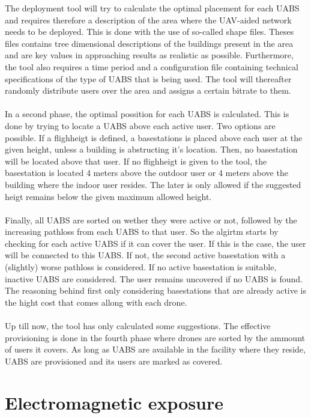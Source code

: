 The deployment tool will try to calculate the optimal placement for each \gls{UABS} and requires therefore a description of the area where the UAV-aided network needs to 
be deployed. This is done with the use of so-called shape files. Theses files contains tree dimensional descriptions of the buildings present in the area and are
key values in approaching results as realistic as possible. Furthermore, the tool also requires a time period and a configuration file containing technical specifications of the type of \gls{UABS} that is being used. 
The tool will thereafter randomly distribute users over the area and assigns a certain bitrate to them. \\
\\
In a second phase, the optimal possition for each \gls{UABS} is calculated. This is done by trying to locate a \gls{UABS} above each active user. Two options are possible.
If a flighheigt is defined, a basestations is placed above each user at the given height, unless a building is abstructing it's location. Then, no basestation will be located above that user.
If no flighheigt is given to the tool, the basestation is located 4 meters above the outdoor user or 4 meters above the building where the indoor user resides. 
The later is only allowed if the suggested heigt remains below the given maximum allowed height. \\
\\
Finally, all  \gls{UABS} are sorted on wether they were active or not, followed by the increasing pathloss from each \gls{UABS} to that user.
So the algirtm starts by checking for each active \gls{UABS} if it can cover the user. If this is the case, the user will be connected to this \gls{UABS}. If not,
the second active basestation with a (slightly) worse pathloss is considered. If no active basestation is suitable, inactive \gls{UABS} are considered. The user remains uncovered if no \gls{UABS}
is found. The reasoning behind first only considering basestations that are already active is the hight cost that comes allong with each drone. \\
\\
Up till now, the tool has only calculated some suggestions. The effective provisioning is done in the fourth phase where drones are sorted by the ammount of users it covers. As long as \gls{UABS}
are available in the facility where they reside, \gls{UABS} are provisioned and its users are marked as covered.


\section{Electromagnetic exposure}
